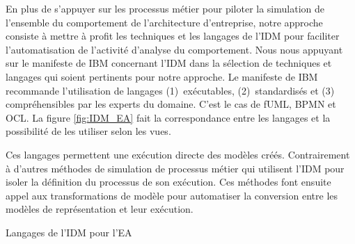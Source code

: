En plus de s'appuyer sur les processus métier pour piloter la simulation de
l'ensemble du comportement de l'architecture d'entreprise, notre approche
consiste à mettre à profit les techniques et les langages de l'IDM pour
faciliter l'automatisation de l'activité d'analyse du comportement. Nous nous
appuyant sur le manifeste de IBM \cite{chesbrough2006research} concernant l'IDM
dans la sélection de techniques et langages qui soient pertinents pour notre
approche. Le manifeste de IBM recommande l'utilisation de langages
(1)~exécutables, (2)~standardisés et (3) compréhensibles par les experts du
domaine. C'est le cas de fUML, BPMN et OCL. La figure \ref{fig:IDM_EA} fait la
correspondance entre les langages et la possibilité de les utiliser selon les
vues.


Ces langages permettent une exécution directe des modèles créés. Contrairement à
d'autres méthodes de simulation de processus métier qui utilisent l'IDM pour
isoler la définition du processus de son exécution. Ces méthodes font ensuite
appel aux transformations de modèle pour automatiser la conversion entre les
modèles de représentation et leur exécution.

\begin{table}[!ht]
    \begin{center}
        
    \end{center}
    \caption{Langages de l'IDM pour l'EA}
    \label{fig:IDM_EA}
\end{table}

        






















